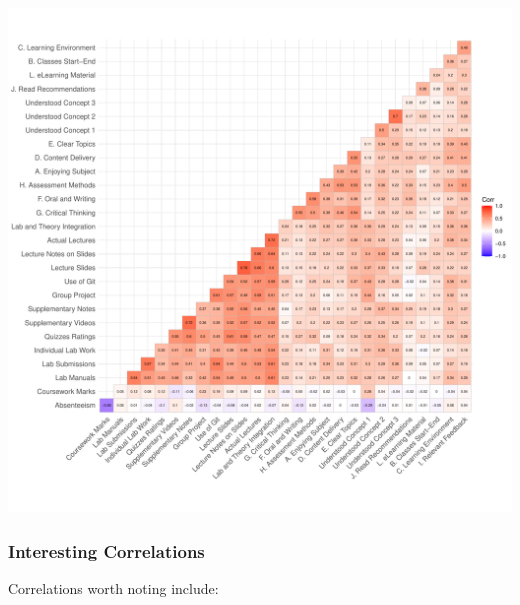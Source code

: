 \documentclass[
]{article}
\begin{document}
\includegraphics{Mid-SemesterCourseEvaluation-20240819-20241125-ADB-BBIT2.2_files/figure-latex/CorrelationMatrixWithFigures-1.pdf}

\subsubsection{Interesting Correlations}\label{interesting-correlations}

Correlations worth noting include:
\end{document}
